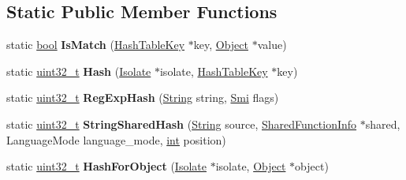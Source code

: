 \subsection*{Static Public Member Functions}
\begin{DoxyCompactItemize}
\item 
\mbox{\label{classv8_1_1internal_1_1CompilationCacheShape_a613407fc3120722d21293dfe69f34521}} 
static \mbox{\hyperlink{classbool}{bool}} {\bfseries Is\+Match} (\mbox{\hyperlink{classv8_1_1internal_1_1HashTableKey}{Hash\+Table\+Key}} $\ast$key, \mbox{\hyperlink{classv8_1_1internal_1_1Object}{Object}} $\ast$value)
\item 
\mbox{\label{classv8_1_1internal_1_1CompilationCacheShape_aeef3fd8d2b49f634a10431ac529e1424}} 
static \mbox{\hyperlink{classuint32__t}{uint32\+\_\+t}} {\bfseries Hash} (\mbox{\hyperlink{classv8_1_1internal_1_1Isolate}{Isolate}} $\ast$isolate, \mbox{\hyperlink{classv8_1_1internal_1_1HashTableKey}{Hash\+Table\+Key}} $\ast$key)
\item 
\mbox{\label{classv8_1_1internal_1_1CompilationCacheShape_a515fdebbed848c8daccb26a1161417f0}} 
static \mbox{\hyperlink{classuint32__t}{uint32\+\_\+t}} {\bfseries Reg\+Exp\+Hash} (\mbox{\hyperlink{classv8_1_1internal_1_1String}{String}} string, \mbox{\hyperlink{classv8_1_1internal_1_1Smi}{Smi}} flags)
\item 
\mbox{\label{classv8_1_1internal_1_1CompilationCacheShape_ae7d10029eae0afb4943bb337c04f5b9b}} 
static \mbox{\hyperlink{classuint32__t}{uint32\+\_\+t}} {\bfseries String\+Shared\+Hash} (\mbox{\hyperlink{classv8_1_1internal_1_1String}{String}} source, \mbox{\hyperlink{classv8_1_1internal_1_1SharedFunctionInfo}{Shared\+Function\+Info}} $\ast$shared, Language\+Mode language\+\_\+mode, \mbox{\hyperlink{classint}{int}} position)
\item 
\mbox{\label{classv8_1_1internal_1_1CompilationCacheShape_a5d4d451ff48f2ec39750884ed39c297f}} 
static \mbox{\hyperlink{classuint32__t}{uint32\+\_\+t}} {\bfseries Hash\+For\+Object} (\mbox{\hyperlink{classv8_1_1internal_1_1Isolate}{Isolate}} $\ast$isolate, \mbox{\hyperlink{classv8_1_1internal_1_1Object}{Object}} $\ast$object)
\end{DoxyCompactItemize}
